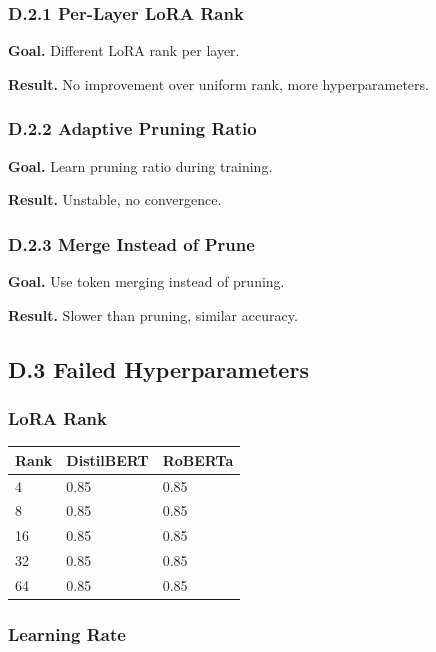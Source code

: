 \subsubsection{D.2.1 Per-Layer LoRA Rank}

\textbf{Goal.} Different LoRA rank per layer.

\textbf{Result.} No improvement over uniform rank, more hyperparameters.

\subsubsection{D.2.2 Adaptive Pruning Ratio}

\textbf{Goal.} Learn pruning ratio during training.

\textbf{Result.} Unstable, no convergence.

\subsubsection{D.2.3 Merge Instead of Prune}

\textbf{Goal.} Use token merging instead of pruning.

\textbf{Result.} Slower than pruning, similar accuracy.

\subsection{D.3 Failed Hyperparameters}

\subsubsection{LoRA Rank}

\begin{table}[H]
\centering
\small
\begin{tabular}{lll}
\toprule
\textbf{Rank} & \textbf{DistilBERT} & \textbf{RoBERTa} \\
\midrule
4 & 0.85 & 0.85 \\
8 & 0.85 & 0.85 \\
16 & 0.85 & 0.85 \\
32 & 0.85 & 0.85 \\
64 & 0.85 & 0.85 \\
\bottomrule
\end{tabular}
\end{table}

\subsubsection{Learning Rate}

